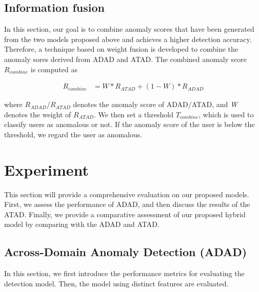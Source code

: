 \documentclass[conference]{IEEEtran}
\begin{document}
\subsection{Information fusion}
In this section, our goal is to combine anomaly scores that have been generated from the two models proposed above and achieves a higher detection accuracy.
Therefore, a technique based on weight fusion is developed to combine the anomaly sores derived  from ADAD and ATAD. The combined anomaly score \emph{$R_{combine}$} is computed as

\begin{align}
R_{combine}&= W*R_{ATAD}+(1-W)*R_{ADAD}
\end{align}

where \emph{$R_{ADAD}$}/\emph{$R_{ATAD}$} denotes the anomaly score of ADAD/ATAD, and \emph{W} denotes the weight of \emph{$R_{ATAD}$}.
We then set a threshold \emph{$T_{combine}$}, which is used to classify users as anomalous or not. If the anomaly score of the user is below the threshold, we regard the user as anomalous.

\section{Experiment}

This section will provide a comprehensive evaluation on our proposed models. First, we assess the performance of ADAD, and then discuss the results of the ATAD. Finally, we 
provide a comparative assessment of our proposed hybrid model by comparing with the ADAD and ATAD.
\subsection{Across-Domain Anomaly Detection (ADAD)}\label{AA}
In this section, we first introduce the performance metrics for evaluating the detection model. 
Then, the model using distinct features are evaluated.
\end{document}

